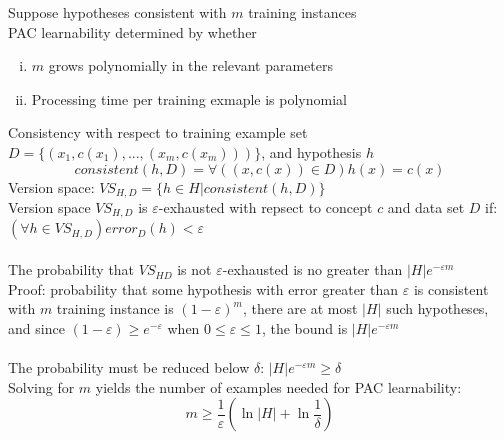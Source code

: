 \documentclass{article}
\begin{document}
			Suppose hypotheses consistent with $m$ training instances \\
			PAC learnability determined by whether
			\begin{enumerate}[(i)]
				\item $m$ grows polynomially in the relevant parameters
				\item Processing time per training exmaple is polynomial
				\end{enumerate}
			Consistency with respect to training example set $D = \{(x_1, c(x_1), ..., (x_m, c(x_m)))\}$, and hypothesis $h$
			\begin{equation*}
				consistent(h, D) = \forall((x, c(x)) \in D) h(x) = c(x)
				\end{equation*}
			Version space: $VS_{H, D} = \{h \in H | consistent(h, D)\}$ \\
			Version space $VS_{H, D}$ is $\varepsilon$-exhausted with repsect to concept $c$ and data set $D$ if: \\
			$(\forall h \in VS_{H, D}) error_D(h) < \varepsilon$ \\
			\\
			The probability that $VS_{HD}$ is not $\varepsilon$-exhausted is no greater than $|H|e^{-\varepsilon m}$ \\
			Proof: probability that some hypothesis with error greater than $\varepsilon$ is consistent with $m$ training instance is $(1 - \varepsilon)^m$, there are at most $|H|$ such hypotheses, and since $(1 - \varepsilon) \geq e^{-\varepsilon}$ when $0 \leq \varepsilon \leq 1$, the bound is $|H|e^{-\varepsilon m}$ \\
			\\
			The probability must be reduced below $\delta$: $|H|e^{-\varepsilon m} \geq \delta$ \\
			Solving for $m$ yields the number of examples needed for PAC learnability:
			\begin{equation*}
				m \geq \frac{1}{\varepsilon}\left(\ln{|H|} + \ln{\frac{1}{\delta}}\right)
				\end{equation*}
\end{document}
